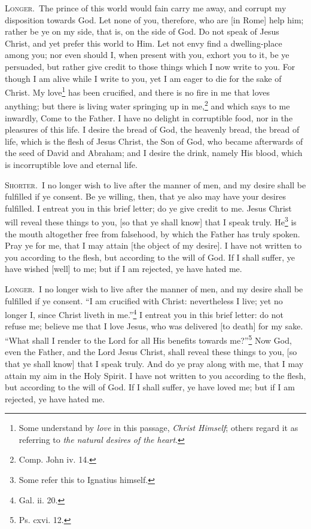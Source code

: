 \textsc{Longer.}~The prince of this world would fain carry me away, and corrupt my disposition towards God. Let none of you, therefore, who are [in Rome] help him; rather be ye on my side, that is, on the side of God. Do not speak of Jesus Christ, and yet prefer this world to Him. Let not envy find a dwelling-place among you; nor even should I, when present with you, exhort you to it, be ye persuaded, but rather give credit to those things which I now write to you. For though I am alive while I write to you, yet I am eager to die for the sake of Christ. My love\footnote{Some understand by \emph{love} in this passage, \emph{Christ Himself}; others regard it as referring to \emph{the natural desires of the heart}.} has been crucified, and there is no fire in me that loves anything; but there is living water springing up in me,\footnote{Comp. John iv. 14.} and which says to me inwardly, Come to the Father. I have no delight in corruptible food, nor in the pleasures of this life. I desire the bread of God, the heavenly bread, the bread of life, which is the flesh of Jesus Christ, the Son of God, who became afterwards of the seed of David and Abraham; and I desire the drink, namely His blood, which is incorruptible love and eternal life.


\textsc{Shorter.}~I no longer wish to live after the manner of men, and my desire shall be fulfilled if ye consent. Be ye willing, then, that ye also may have your desires fulfilled. I entreat you in this brief letter; do ye give credit to me. Jesus Christ will reveal these things to you, [so that ye shall know] that I speak truly. He\footnote{Some refer this to Ignatius himself.} is the mouth altogether free from falsehood, by which the Father has truly spoken. Pray ye for me, that I may attain [the object of my desire]. I have not written to you according to the flesh, but according to the will of God. If I shall suffer, ye have wished [well] to me; but if I am rejected, ye have hated me.

\textsc{Longer.}~I no longer wish to live after the manner of men, and my desire shall be fulfilled if ye consent. “I am crucified with Christ: nevertheless I live; yet no longer I, since Christ liveth in me.”\footnote{Gal. ii. 20.} I entreat you in this brief letter: do not refuse me; believe me that I love Jesus, who was delivered [to death] for my sake. “What shall I render to the Lord for all His benefits towards me?”\footnote{Ps. cxvi. 12.} Now God, even the Father, and the Lord Jesus Christ, shall reveal these things to you, [so that ye shall know] that I speak truly. And do ye pray along with me, that I may attain my aim in the Holy Spirit. I have not written to you according to the flesh, but according to the will of God. If I shall suffer, ye have loved me; but if I am rejected, ye have hated me.

